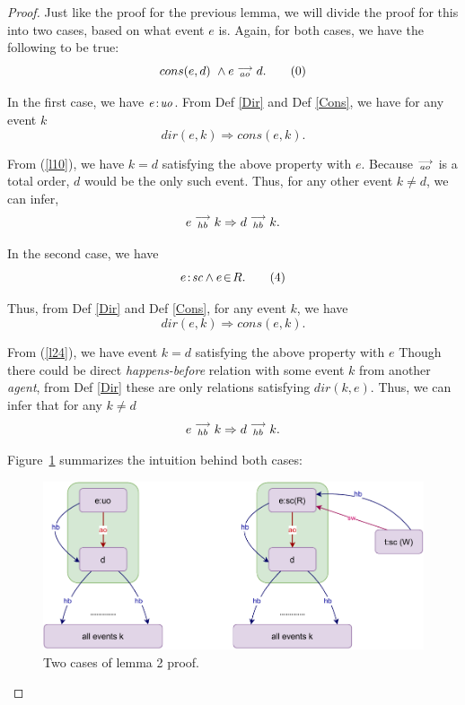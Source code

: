 \begin{proof}
    
    Just like the proof for the previous lemma, we will divide the proof for this into two cases, based on what event $e$ is. Again, for both cases, we have the following to be true: 
    \[
        cons(e,d) \ \wedge e\stackrel{\longrightarrow}{_{ao}}d.
        \tag{0}
        \label{l20}
    \]

   In the first case, we have $e\!:\!\textit{uo}$. From Def \ref{Dir} and Def \ref{Cons}, we have for any event $k$
   \[
        dir(e,k) \Rightarrow cons(e,k).
   \]
   
   From (\ref{l10}), we have $k=d$ satisfying the above property with $e$. 
   Because $\stackrel{\longrightarrow}{_{ao}}$ is a total order, $d$ would be the only such event. 
   Thus, for any other event $k \neq d$, we can infer,  
   \[
        e\stackrel{\longrightarrow}{_{hb}}k \Rightarrow d\stackrel{\longrightarrow}{_{hb}}k.
   \]
   
    In the second case, we have 
    \[
        e\!:\!\textit{sc} \wedge e\!\in\!R.
        \tag{4}
        \label{l24}
    \]
    
    Thus, from Def \ref{Dir} and Def \ref{Cons}, for any event $k$, we have 
    \[
        dir(e,k) \Rightarrow cons(e,k).
    \]
    
    From (\ref{l24}), we have event $k=d$ satisfying the above property with $e$  
    Though there could be direct \textit{happens-before} relation with some event $k$ from another \textit{agent}, from Def \ref{Dir} these are only relations satisfying $dir(k,e)$. Thus, we can infer that for any $k \neq d$ 
    \[
        e\stackrel{\longrightarrow}{_{hb}}k \Rightarrow d\stackrel{\longrightarrow}{_{hb}}k.
    \]
    
    Figure~\ref{lemma:second} summarizes the intuition behind both cases: 
    \begin{figure}[H]
        \centering
        \includegraphics[scale=0.7]{4.InstructionReordering/3.Lemmas/Lemma2.pdf}
        \caption{Two cases of lemma 2 proof.}
        \label{lemma:second}
    \end{figure}

\end{proof}

